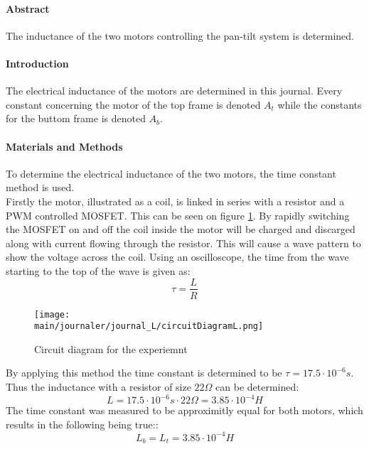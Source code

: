 \documentclass[../../main]{subfiles}
\begin{document}
\paragraph{Abstract}

The inductance of the two motors controlling the pan-tilt system is determined.

\paragraph{Introduction}

The electrical inductance of the motors are determined in this journal. Every constant concerning the motor of the top frame is denoted $A_t$ while the constants for the buttom frame is denoted $A_b$.

\paragraph{Materials and Methods}

To determine the electrical inductance of the two motors, the time constant method is used.\\
Firstly the motor, illustrated as a coil, is linked in series with a resistor and a PWM controlled MOSFET. This can be seen on figure \ref{fig:inductance_circuit}. By rapidly switching the MOSFET on and off the coil inside the motor will be charged and discarged along with current flowing through the resistor. This will cause a wave pattern to show the voltage across the coil. Using an oscilloscope, the time from the wave starting to the top of the wave is given as:
$$\tau = \frac{L}{R}$$

\begin{figure}[h]
  \begin{center}
    \texttt{[image: \\main/journaler/journal\_L/circuitDiagramL.png]}
  \end{center}
    \caption{Circuit diagram for the experiemnt}
    \label{fig:inductance_circuit}
\end{figure}

By applying this method the time constant is determined to be $\tau = 17.5 \cdot 10^{-6}s$. Thus the inductance with a resistor of size $22\Omega$ can be determined:\\
$$L = 17.5 \cdot 10^{-6}s \cdot 22 \Omega = 3.85 \cdot 10^{-4}H$$
The time constant was measured to be approximitly equal for both motors, which results in the following being true::\\
$$L_b=L_t=3.85 \cdot 10^{-4}H$$
\end{document}
